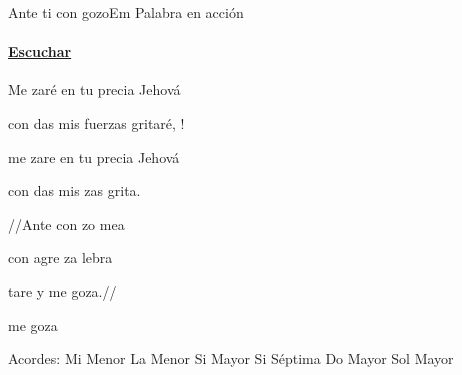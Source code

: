 \documentclass[12pt, spanish]{book}
\begin{document}
    \begin{song}{Ante ti con gozo}{Em}
    {} %
    {Palabra en acción}
    {} %
    {}
        \ifChordBk
            \paragraph{\mbox{}\hfill\protect\href{https://open.spotify.com/intl-es/track/1LxX93dfHFpDqjsvVZi9W8}{Escuchar}\mbox{}\hfill}
        \fi


        \begin{SBOpGroup}
            Me zaré en tu precia Jehová

            con das mis fuerzas gritaré, !

            me zare en tu precia Jehová

            con das mis zas grita.
        \end{SBOpGroup}

        \begin{SBChorus}
            //Ante  con zo mea

            con agre za lebra

            tare y me goza.//

            me goza
        \end{SBChorus}

        \ifChordBk
        \begin{SBOpGroup}
            Acordes:\break
            \upchord{\Em}\qquad Mi Menor \hfill
            \upchord{\Am}\qquad La Menor \hfill\null\break
            \upchord{\B}\qquad Si Mayor \hfill
            \upchord{\Bseven}\qquad Si S\'eptima \hfill\null\break
            \upchord{\C}\qquad Do Mayor \hfill
            \upchord{\G}\qquad Sol Mayor \hfill\null\break
        \end{SBOpGroup}
        \fi
    \end{song}
\end{document}
